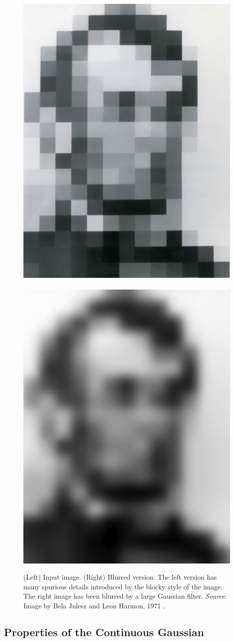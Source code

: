 \begin{figure}[t]
\centerline{
\includegraphics[width=.35\linewidth]{figures/blur_filters/Jules_Lincoln_1971.jpg}
~~
\includegraphics[width=.35\linewidth]{figures/blur_filters/Jules_Lincoln_1971_blur.jpg}
}
\caption{(Left)  Input image.  (Right)  Blurred version.  The left
  version has many spurious details introduced by the blocky style of
  the image.  The right image has been blurred by a large Gaussian
  filter.  
  {\em Source}: Image by Bela Julesz and Leon Harmon, 1971 \cite{Harmon_1973}.
} 
\label{fig:lincoln}
\end{figure}

\subsection{Properties of the Continuous Gaussian}

